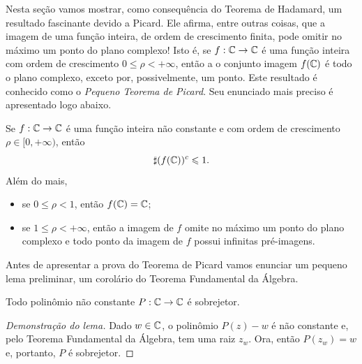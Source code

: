     Nesta seção vamos mostrar, como consequência do Teorema de Hadamard, um resultado fascinante devido a Picard. Ele afirma, entre outras coisas, 
    que a imagem de uma função inteira, de ordem de crescimento finita, pode omitir no máximo um ponto do plano complexo! 
    Isto é, se $f:\mathbb{C}\to\mathbb{C}$ é uma função inteira com ordem de 
    crescimento $0\leqslant \rho<+\infty$, então a o conjunto imagem $f(\mathbb{C})$ 
    é todo o plano complexo, exceto por, possivelmente, um ponto.
    Este resultado é conhecido como o {\it Pequeno Teorema de Picard}. Seu enunciado mais preciso é apresentado logo abaixo.
 
    
        \begin{teorema}
        \label{teo:pequeno-picard}
            Se $f:\mathbb{C}\to\mathbb{C}$ é uma função inteira não constante e com ordem de crescimento 
            $\rho \in [0,+\infty)$, então
            \[
              \sharp (f(\mathbb{C}))^c \leqslant 1.
            \]
            Além do mais,
            \begin{itemize}
                \item se $0\leqslant \rho<1$, então $f(\mathbb{C})=\mathbb{C}$; 
                
                \item se $1\leqslant \rho<+\infty$, então 
                a imagem de $f$ omite no máximo um ponto do plano complexo 
                e todo ponto da imagem de $f$ possui infinitas pré-imagens.
            \end{itemize}
        \end{teorema}

        \medskip 
        Antes de apresentar a prova do Teorema de Picard vamos enunciar um pequeno lema preliminar, um corolário do Teorema Fundamental da Álgebra.
        
        \medskip 
        \begin{lema}
        \label{lema-pol-sobrejetor}
            Todo polinômio não constante $P:\mathbb{C}\to\mathbb{C}$ é sobrejetor.
        \end{lema}
        \begin{proof}[Demonstração do lema]
            Dado $w\in\mathbb{C}$, o polinômio $P(z) - w$ é não constante e, pelo
            Teorema Fundamental da Álgebra, tem uma raiz $z_w$. Ora, então
            $P(z_w) = w$ e, portanto, $P$ é sobrejetor.
        \end{proof}
        
